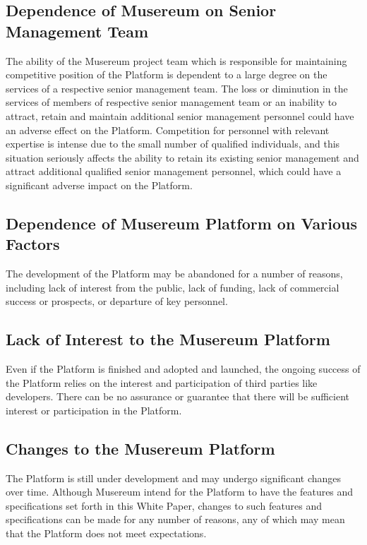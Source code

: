 \documentclass[12pt]{report}
\begin{document}
\subsection*{Dependence of Musereum on Senior Management Team}
The ability of the Musereum project team which is responsible for maintaining competitive position of the Platform is dependent to a large degree on the services of a respective senior management team. The loss or diminution in the services of members of respective senior management team or an inability to attract, retain and maintain additional senior management personnel could have an adverse effect on the Platform. Competition for personnel with relevant expertise is intense due to the small number of qualified individuals, and this situation seriously affects the ability to retain its existing senior management and attract additional qualified senior management personnel, which could have a significant adverse impact on the Platform.

\subsection*{Dependence of Musereum Platform on Various Factors}
The development of the Platform may be abandoned for a number of reasons, including lack of interest from the public, lack of funding, lack of commercial success or prospects, or departure of key personnel.

\subsection*{Lack of Interest to the Musereum Platform}
Even if the Platform is finished and adopted and launched, the ongoing success of the Platform relies on the interest and participation of third parties like developers. There can be no assurance or guarantee that there will be sufficient interest or participation in the Platform.

\subsection*{Changes to the Musereum Platform}
The Platform is still under development and may undergo significant changes over time. Although Musereum intend for the Platform to have the features and specifications set forth in this White Paper, changes to such features and specifications can be made for any number of reasons, any of which may mean that the Platform does not meet expectations.
\end{document}
